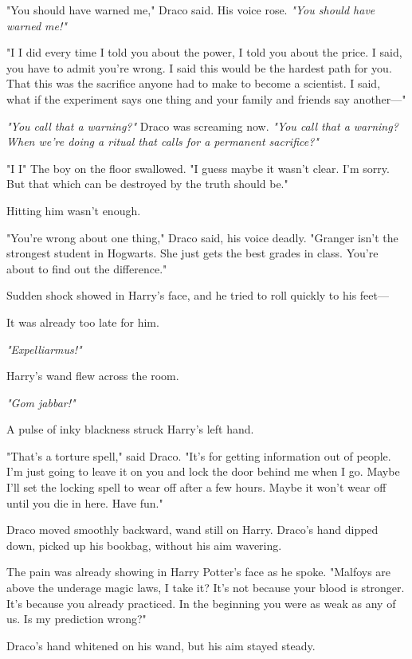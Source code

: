 "You should have warned me," Draco said. His voice rose. \emph{"You should have
warned me!"}

"I{\el} I did{\el} every time I told you about the power, I told you
about the price. I said, you have to admit you're wrong. I said this would be
the hardest path for you. That this was the sacrifice anyone had to make to
become a scientist. I said, what if the experiment says one thing and your
family and friends say another\mbox{---}"

\emph{"You call that a warning?"} Draco was screaming now. \emph{"You call that
a warning? When we're doing a ritual that calls for a permanent sacrifice?"}

"I{\el} I{\el}" The boy on the floor swallowed. "I guess maybe it wasn't
clear. I'm sorry. But that which can be destroyed by the truth should be."

Hitting him wasn't enough.

"You're wrong about one thing," Draco said, his voice deadly. "Granger isn't
the strongest student in Hogwarts. She just gets the best grades in class.
You're about to find out the difference."

Sudden shock showed in Harry's face, and he tried to roll quickly to his feet\mbox{---}

It was already too late for him.

\emph{"Expelliarmus!"}

Harry's wand flew across the room.

\emph{"Gom jabbar!"}

A pulse of inky blackness struck Harry's left hand.

"That's a torture spell," said Draco. "It's for getting information out of
people. I'm just going to leave it on you and lock the door behind me when I
go. Maybe I'll set the locking spell to wear off after a few hours. Maybe it
won't wear off until you die in here. Have fun."

Draco moved smoothly backward, wand still on Harry. Draco's hand dipped down,
picked up his bookbag, without his aim wavering.

The pain was already showing in Harry Potter's face as he spoke. "Malfoys are
above the underage magic laws, I take it? It's not because your blood is
stronger. It's because you already practiced. In the beginning you were as weak
as any of us. Is my prediction wrong?"

Draco's hand whitened on his wand, but his aim stayed steady.

